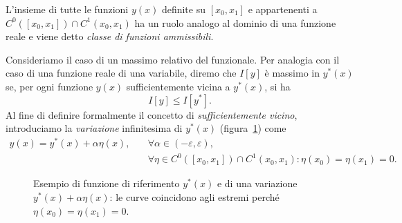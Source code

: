 L'insieme di tutte le funzioni $y(x)$ definite su $[x_0, x_1]$ e appartenenti a $C^0([x_0, x_1])\cap C^1(x_0, x_1)$ ha un ruolo analogo al dominio di una funzione reale e viene detto \emph{classe di funzioni ammissibili}.

Consideriamo il caso di un massimo relativo del funzionale. Per analogia con il caso di una funzione reale di una variabile, diremo che $I[y]$ è massimo in $y^*(x)$ se, per ogni funzione $y(x)$ sufficientemente vicina a $y^*(x)$, si ha
\begin{equation*}
    I[y] \leq I[y^*].
\end{equation*}
Al fine di definire formalmente il concetto di \emph{sufficientemente vicino}, introduciamo la \emph{variazione} infinitesima di $y^*(x)$ (figura~\ref{fig:variazioni_estremi_fissi}) come
\begin{align*}
    y(x) = y^*(x) + \alpha \eta(x), \quad &\forall \alpha \in (-\varepsilon, \varepsilon), \\
    &\forall \eta \in C^0([x_0, x_1])\cap C^1(x_0, x_1): \eta(x_0) = \eta(x_1) = 0.
\end{align*}


\begin{figure}[h!]
    \centering
    \caption{Esempio di funzione di riferimento $y^*(x)$ e di una variazione $y^*(x)+\alpha\eta(x)$: le curve coincidono agli estremi perché $\eta(x_0)=\eta(x_1)=0$.}
    \label{fig:variazioni_estremi_fissi}
\end{figure}

